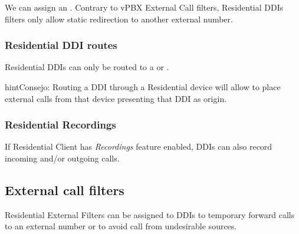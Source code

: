 \documentclass[letterpaper,10pt,spanish]{sphinxmanual}
\begin{document}
We can assign an {\hyperref[administration_portal/client/vpbx/routing_tools/external_call_filters:external\string-call\string-filters]{}}. Contrary to vPBX External Call filters, Residential DDIs
filters only allow static redirection to another external number.


\subsubsection{Residential DDI routes}
\label{administration_portal/client/residential/ddis:residential-ddi-routes}
Residential DDIs can only be routed to a {\hyperref[administration_portal/client/residential/residential_devices:residential\string-devices]{}}
or {\hyperref[administration_portal/client/vpbx/faxes:faxing\string-system]{}}.

\begin{notice}{hint}{Consejo:}
Routing a DDI through a Residential device will allow to place external calls
from that device presenting that DDI as origin.
\end{notice}


\subsubsection{Residential Recordings}
\label{administration_portal/client/residential/ddis:residential-recordings}
If Residential Client has \emph{Recordings} feature enabled, DDIs can also record incoming and/or
outgoing calls.


\subsection{External call filters}
\label{administration_portal/client/residential/external_call_filters:external-call-filters}\label{administration_portal/client/residential/external_call_filters:residential-filters}\label{administration_portal/client/residential/external_call_filters::doc}
Residential External Filters can be assigned to DDIs to temporary
forward calls to an external number or to avoid call from undesirable sources.
\end{document}
